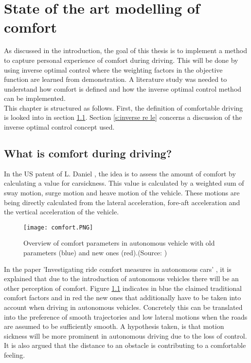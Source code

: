 \chapter{State of the art modelling of comfort}
\label{cha:Literature_study}
As discussed in the introduction, the goal of this thesis is to implement a method to capture personal experience of comfort during driving. This will be done by using inverse optimal control where the weighting factors in the objective function are learned from demonstration. A literature study was needed to understand how comfort is defined and how the inverse optimal control method can be implemented.\\

This chapter is structured as follows. First, the definition of comfortable driving is looked into in section \ref{s:comfort_parameters}. Section \ref{s:inverse re le} concerns a discussion of the inverse optimal control concept used.

\section{What is comfort during driving?}
\label{s:comfort_parameters}
In the US patent of L. Daniel \cite{Daniel2018}, the idea is to assess the amount of comfort by calculating a value for carsickness. This value is calculated by a weighted sum of sway motion, surge motion and heave motion of the vehicle. These motions are being directly calculated from the lateral acceleration, fore-aft acceleration and the vertical acceleration of the vehicle. \\

\begin{figure}[h!]
	\centering
	\texttt{[image: comfort.PNG]}
	\caption{Overview of comfort parameters in autonomous vehicle with old parameters (blue) and new ones (red).(Source: \cite{Elbanhawi2015})}
	\label{fig:Comfort}
\end{figure} 

In the paper 'Investigating ride comfort measures in autonomous cars' \cite{Elbanhawi2015}, it is explained that due to the introduction of autonomous vehicles there will be an other perception of comfort. Figure \ref{fig:Comfort} indicates in blue the claimed traditional comfort factors and in red the new ones that additionally have to be taken into account when driving in autonomous vehicles. Concretely this can be translated into the preference of smooth trajectories and low lateral motions when the roads are assumed to be sufficiently smooth. A hypothesis taken, is that motion sickness will be more prominent in autonomous driving due to the loss of control. It is also argued that the distance to an obstacle is contributing to a comfortable feeling.\\

